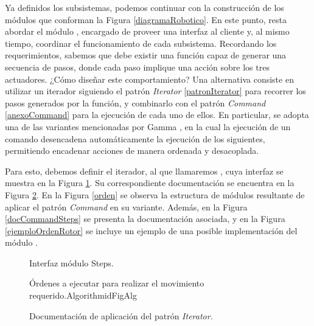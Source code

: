 Ya definidos los subsistemas, podemos continuar con la construcción de los módulos que conforman la Figura \ref{diagramaRobotico}. En este punto, resta abordar el módulo \MainController, encargado de proveer una interfaz al cliente y, al mismo tiempo, coordinar el funcionamiento de cada subsistema. Recordando los requerimientos, sabemos que debe existir una función capaz de generar una secuencia de pasos, donde cada paso implique una acción sobre los tres actuadores. ¿Cómo diseñar este comportamiento? Una alternativa consiste en utilizar un iterador siguiendo el patrón \textit{Iterator} \ref{patronIterator} para recorrer los pasos generados por la función, y combinarlo con el patrón \textit{Command} \ref{anexoCommand} para la ejecución de cada uno de ellos. En particular, se adopta una de las variantes mencionadas por Gamma \cite{Gamma:1995:DPE:186897}, en la cual la ejecución de un comando desencadena automáticamente la ejecución de los siguientes, permitiendo encadenar acciones de manera ordenada y desacoplada.

Para esto, debemos definir el iterador, al que llamaremos \Steps, cuya interfaz se muestra en la Figura \ref{iterator}. Su correspondiente documentación se encuentra en la Figura \ref{docIterator}. En la Figura \ref{orden} se observa la estructura de módulos resultante de aplicar el patrón \textit{Command} en su variante. Además, en la Figura \ref{docCommandSteps} se presenta la documentación asociada, y en la Figura \ref{ejemploOrdenRotor} se incluye un ejemplo de una posible implementación del módulo \OrdenRotor.

\begin{figure}[H]
\caption{Interfaz módulo Steps.}
\label{iterator}
\begin{center}
\end{center}
\end{figure}
\begin{figure}
\caption{Documentación de aplicación del patrón \textit{Iterator}.}
\label{docIterator}
\begin{pattern}[]{Órdenes a ejecutar para realizar el movimiento requerido.}{Algorithm}{idFigAlg}
\assigns
{}

\end{pattern}
\end{figure}

